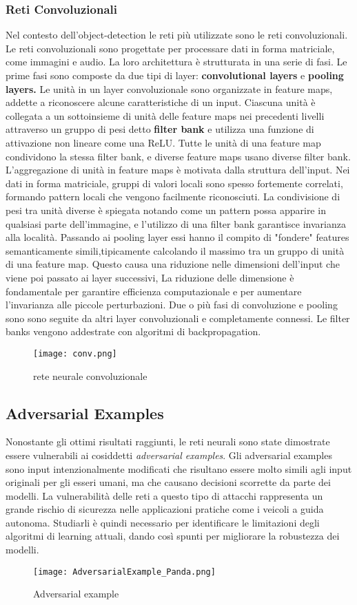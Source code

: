 \subsubsection{Reti Convoluzionali}
Nel contesto dell'object-detection le reti più utilizzate sono le reti convoluzionali. Le reti convoluzionali sono  progettate per processare dati in forma 
matriciale, come immagini e audio. La loro architettura è strutturata in una serie di fasi. Le prime fasi sono composte da due tipi di layer: \textbf{convolutional layers}
e \textbf{pooling layers.}
Le unità in un layer convoluzionale sono organizzate in feature maps, addette a riconoscere alcune caratteristiche di un input. Ciascuna unità è collegata
a un sottoinsieme di unità delle feature maps nei precedenti livelli attraverso un gruppo di pesi detto \textbf{filter bank} e utilizza una funzione di attivazione non lineare come una ReLU. Tutte le unità di una feature map condividono 
la stessa filter bank, e diverse feature maps usano diverse filter bank. L'aggregazione di unità in feature maps è motivata dalla struttura dell'input. Nei dati in forma matriciale, gruppi di valori locali sono spesso fortemente correlati,
formando pattern locali che vengono facilmente riconosciuti. La condivisione di pesi tra unità  diverse è spiegata notando come un pattern possa apparire in qualsiasi parte dell'immagine, e l'utilizzo di una filter bank garantisce invarianza alla località.
Passando ai pooling layer essi hanno il compito di "fondere" features semanticamente simili,tipicamente calcolando il massimo tra un gruppo di unità di una feature map. Questo causa una riduzione nelle dimensioni dell'input che viene poi passato
ai layer successivi, La riduzione delle dimensione è fondamentale per garantire efficienza computazionale e per aumentare l'invarianza alle piccole perturbazioni.
Due o più fasi di convoluzione e pooling sono  sono seguite da altri layer convoluzionali e completamente connessi. Le filter banks vengono addestrate con algoritmi di backpropagation.\cite{deep}
\begin{figure}[h]
  \texttt{[image: conv.png]}
  \caption{rete neurale convoluzionale}
  \label{fig:conv}
\end{figure} 

\subsection{Adversarial Examples}
Nonostante gli ottimi risultati raggiunti, le reti neurali sono state dimostrate essere vulnerabili ai cosiddetti \emph{adversarial examples}\cite{art2018}. Gli adversarial
examples sono input intenzionalmente modificati che risultano essere molto simili agli input originali per gli esseri umani, ma che causano decisioni scorrette
da parte dei modelli. La vulnerabilità delle reti a questo tipo di attacchi rappresenta un grande rischio di sicurezza nelle applicazioni pratiche come i veicoli a guida autonoma. Studiarli
è quindi necessario per identificare le limitazioni degli algoritmi di learning attuali, dando così spunti per migliorare la robustezza dei modelli.

\begin{figure}[h]
  \texttt{[image: AdversarialExample\_Panda.png]}
  \caption{Adversarial example \cite{art2018}}
  \label{fig:adv}
\end{figure}

    